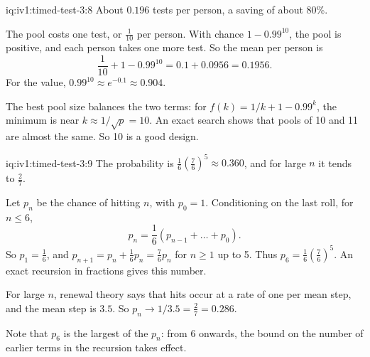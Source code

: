 \begin{solution}{iq:iv1:timed-test-3:8}
About $0.196$ tests per person, a saving of about 80\%.

The pool costs one test, or $\frac{1}{10}$ per person. With chance $1 - 0.99^{10}$, the pool is positive, and each person takes one more test. So the mean per person is
\[
\frac{1}{10} + 1 - 0.99^{10} = 0.1 + 0.0956 = 0.1956.
\]
For the value, $0.99^{10} \approx e^{-0.1} \approx 0.904$.

The best pool size balances the two terms: for $f(k) = 1/k + 1 - 0.99^k$, the minimum is near $k \approx 1/\sqrt{p} = 10$. An exact search shows that pools of 10 and 11 are almost the same. So 10 is a good design.

\end{solution}

\begin{solution}{iq:iv1:timed-test-3:9}
The probability is $\frac16(\frac76)^5 \approx 0.360$, and for large $n$ it tends to $\frac27$.

Let $p_n$ be the chance of hitting $n$, with $p_0 = 1$. Conditioning on the last roll, for $n \le 6$,
\[
p_n = \frac16(p_{n - 1} + \dots + p_0).
\]
So $p_1 = \frac16$, and $p_{n + 1} = p_n + \frac16p_n = \frac76p_n$ for $n \ge 1$ up to 5. Thus $p_6 = \frac16(\frac76)^5$. An exact recursion in fractions gives this number.

For large $n$, renewal theory says that hits occur at a rate of one per mean step, and the mean step is $3.5$. So $p_n \to 1/3.5 = \frac27 = 0.286$.

Note that $p_6$ is the largest of the $p_n$: from 6 onwards, the bound on the number of earlier terms in the recursion takes effect.

\end{solution}

